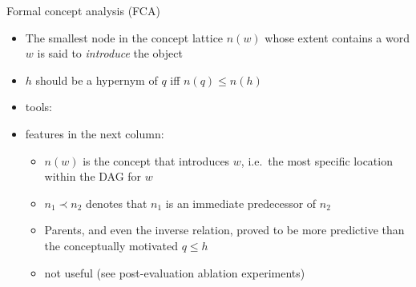 \documentclass{beamer}
\newlength{\onecolwid}
\begin{document}
\begin{frame}[t]
\begin{columns}[t]
\begin{column}{\onecolwid}
\begin{block}{Formal concept analysis (FCA)}
\begin{itemize}
          \item The smallest node in the concept lattice $n(w)$ whose extent contains a word
            $w$ is said to \emph{introduce} the object
          \item $h$ should be a hypernym of $q$ iff $n(q)\le n(h)$
          \item tools: \citet{Endres:2010,Cimiano:2005}
          \item features in the next column:%
            \begin{itemize}
              \item $n(w)$ is the concept that introduces $w$, i.e.~the most specific
                location within the DAG for $w$

              \item $n_1\prec n_2$ denotes that $n_1$ is an immediate predecessor of $n_2$
              \item Parents, and even the inverse relation, proved to be more predictive
                than the conceptually motivated  $q\le h$
              \item not useful (see post-evaluation ablation experiments)
            \end{itemize}
        \end{itemize}
      \end{block}


\end{column}
\end{columns}
\end{frame}
\end{document}
